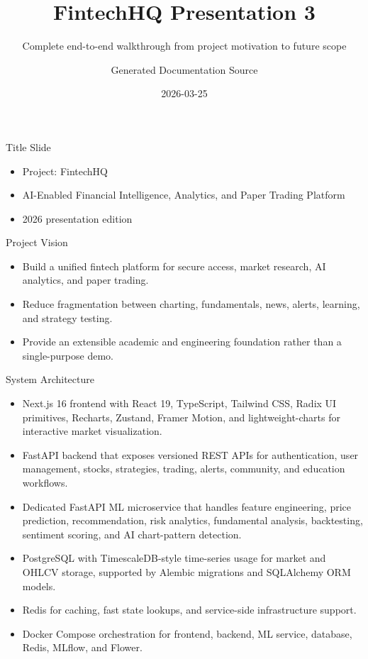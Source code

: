 \documentclass{beamer}
\title{FintechHQ Presentation 3}
\subtitle{Complete end-to-end walkthrough from project motivation to future scope}
\author{Generated Documentation Source}
\date{2026-03-25}
\begin{document}
\begin{frame}
\titlepage
\end{frame}
\begin{frame}{Title Slide}
\begin{itemize}
\item Project: FintechHQ
\item AI-Enabled Financial Intelligence, Analytics, and Paper Trading Platform
\item 2026 presentation edition
\end{itemize}
\end{frame}
\begin{frame}{Project Vision}
\begin{itemize}
\item Build a unified fintech platform for secure access, market research, AI analytics, and paper trading.
\item Reduce fragmentation between charting, fundamentals, news, alerts, learning, and strategy testing.
\item Provide an extensible academic and engineering foundation rather than a single-purpose demo.
\end{itemize}
\end{frame}
\begin{frame}{System Architecture}
\begin{itemize}
\item Next.js 16 frontend with React 19, TypeScript, Tailwind CSS, Radix UI primitives, Recharts, Zustand, Framer Motion, and lightweight-charts for interactive market visualization.
\item FastAPI backend that exposes versioned REST APIs for authentication, user management, stocks, strategies, trading, alerts, community, and education workflows.
\item Dedicated FastAPI ML microservice that handles feature engineering, price prediction, recommendation, risk analytics, fundamental analysis, backtesting, sentiment scoring, and AI chart-pattern detection.
\item PostgreSQL with TimescaleDB-style time-series usage for market and OHLCV storage, supported by Alembic migrations and SQLAlchemy ORM models.
\item Redis for caching, fast state lookups, and service-side infrastructure support.
\item Docker Compose orchestration for frontend, backend, ML service, database, Redis, MLflow, and Flower.
\end{itemize}
\end{frame}
\end{document}
